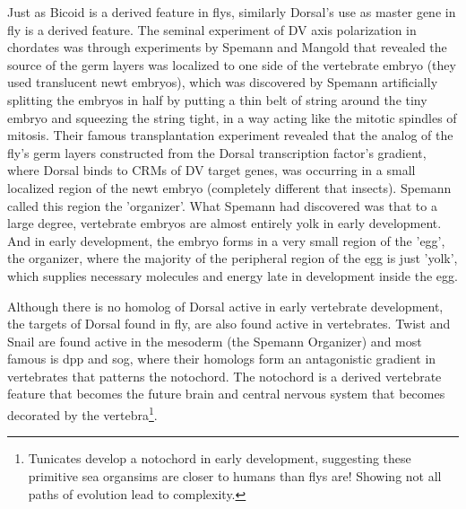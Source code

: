 
Just as Bicoid is a derived feature in flys, similarly Dorsal's use as master gene in fly is a derived feature.  The seminal experiment of DV axis polarization in chordates was through experiments by Spemann and Mangold that revealed the source of the germ layers was localized to one side of the vertebrate embryo (they used translucent newt embryos), which was discovered by Spemann artificially splitting the embryos in half by putting a thin belt of string around the tiny embryo and squeezing the string tight, in a way acting like the mitotic spindles of mitosis.  Their famous transplantation experiment revealed that the analog of the fly's germ layers constructed from the Dorsal transcription factor's gradient, where Dorsal binds to CRMs of DV target genes, was occurring in a small localized region of the newt embryo (completely different that insects).  Spemann called this region the 'organizer'.  What Spemann had discovered was that to a large degree, vertebrate embryos are almost entirely yolk in early development.  And in early development, the embryo forms in a very small region of the 'egg', the organizer, where the majority of the peripheral region of the egg is just 'yolk', which supplies necessary molecules and energy late in development inside the egg.   

Although there is no homolog of Dorsal active in early vertebrate development, the targets of Dorsal found in fly, are also found active in vertebrates.  Twist and Snail are found active in the mesoderm (the Spemann Organizer) and most famous is dpp and sog, where their homologs form an antagonistic gradient in vertebrates that patterns the notochord.  The notochord is a derived vertebrate feature that becomes the future brain and central nervous system that becomes decorated by the vertebra\footnote{Tunicates develop a notochord in early development, suggesting these primitive sea organsims are closer to humans than flys are!  Showing not all paths of evolution lead to complexity.}. 

